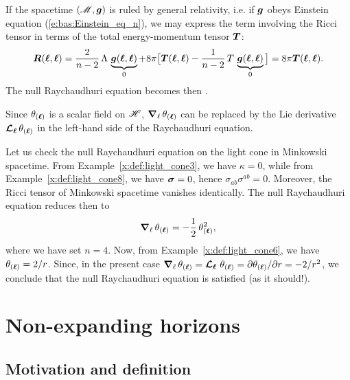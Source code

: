 {{If the spacetime $(\mathscr{M},\bm{g})$ is ruled by general relativity, i.e. if
$\bm{g}$ obeys Einstein equation (\ref{e:bas:Einstein_eq_n}), we may express
the term involving the Ricci tensor in terms of the total energy-momentum tensor
$\bm{T}$:
\[
  \bm{R}(\bm{\ell}, \bm{\ell})  = \frac{2}{n-2}\,\Lambda\,  \underbrace{\bm{g}(\bm{\ell}, \bm{\ell})}_{0}
    + 8\pi \big[ \bm{T}(\bm{\ell}, \bm{\ell}) - \frac{1}{n-2}\,  T \, \underbrace{\bm{g}(\bm{\ell}, \bm{\ell})}_{0} \big]
    = 8\pi \bm{T}(\bm{\ell}, \bm{\ell}) .
\]
The null Raychaudhuri equation becomes then
\be \label{e:def:null_Raychaud}
    .
\ee

\begin{remark}
Since $\theta_{(\bm{\ell})}$ is a scalar field on $\mathscr{H}$, $\bm{\nabla}_{\ell}\,  \theta_{(\bm{\ell})}$
can be replaced by the Lie derivative $\bm{\mathcal{L}}_{\bm{\bm{\ell}}}\, \theta_{(\bm{\ell})}$ in the left-hand side of the Raychaudhuri
equation.
\end{remark}

\begin{example}
Let us check the null Raychaudhuri equation on the light cone in Minkowski
spacetime. From Example~\ref{x:def:light_cone3}, we have $\kappa=0$, while
from Example~\ref{x:def:light_cone8}, we have $\bm{\sigma}=0$,
hence $\sigma_{ab} \sigma^{ab}=0$. Moreover, the Ricci tensor of Minkowski
spacetime vanishes identically. The null Raychaudhuri equation reduces
then to
\[
    \bm{\nabla}_{\ell}\,  \theta_{(\bm{\ell})} =  - \frac{1}{2} \, \theta_{(\bm{\ell})}^2 ,
\]
where we have set $n=4$. Now, from Example~\ref{x:def:light_cone6}, we
have $\theta_{(\bm{\ell})} = 2/r$. Since, in the present case
$\bm{\nabla}_{\ell}\,  \theta_{(\bm{\ell})}  = \bm{\mathcal{L}}_{\bm{\ell}}\, \,  \theta_{(\bm{\ell})}  = {\partial \theta_{(\bm{\ell})}}/{\partial r} =
- 2/r^2$, we conclude that the null Raychaudhuri equation is satisfied (as
it should!).
\end{example}


\section{Non-expanding horizons}

\subsection{Motivation and definition}

}}
